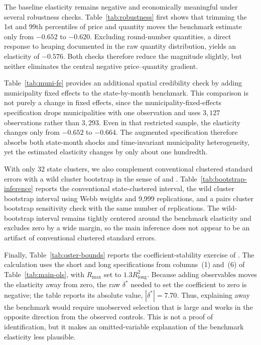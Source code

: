 The baseline elasticity remains negative and economically meaningful under several robustness checks.  Table~\ref{tab:robustness} first shows that trimming the 1st and 99th percentiles of price and quantity moves the benchmark estimate only from $-0.652$ to $-0.620$.  Excluding round-number quantities, a direct response to heaping documented in the raw quantity distribution, yields an elasticity of $-0.576$.  Both checks therefore reduce the magnitude slightly, but neither eliminates the central negative price--quantity gradient.



Table~\ref{tab:muni-fe} provides an additional spatial credibility check by adding municipality fixed effects to the state-by-month benchmark.  This comparison is not purely a change in fixed effects, since the municipality-fixed-effects specification drops municipalities with one observation and uses $3{,}127$ observations rather than $3{,}293$.  Even in that restricted sample, the elasticity changes only from $-0.652$ to $-0.664$.  The augmented specification therefore absorbs both state-month shocks and time-invariant municipality heterogeneity, yet the estimated elasticity changes by only about one hundredth.



With only 32 state clusters, we also complement conventional clustered standard errors with a wild cluster bootstrap in the sense of \citet{cameron2008bootstrap} and \citet{roodman2019fast}.  Table~\ref{tab:bootstrap-inference} reports the conventional state-clustered interval, the wild cluster bootstrap interval using Webb weights and 9{,}999 replications, and a pairs cluster bootstrap sensitivity check with the same number of replications.  The wild-bootstrap interval remains tightly centered around the benchmark elasticity and excludes zero by a wide margin, so the main inference does not appear to be an artifact of conventional clustered standard errors.



Finally, Table~\ref{tab:oster-bounds} reports the coefficient-stability exercise of \citet{oster2019unobservable}.  The calculation uses the short and long specifications from columns~(1) and~(6) of Table~\ref{tab:main-ols}, with $R_{\max}$ set to $1.3R^2_{\text{long}}$.  Because adding observables moves the elasticity away from zero, the raw $\delta^{*}$ needed to set the coefficient to zero is negative; the table reports its absolute value, $|\delta^{*}|=7.70$.  Thus, explaining away the benchmark would require unobserved selection that is large and works in the opposite direction from the observed controls.  This is not a proof of identification, but it makes an omitted-variable explanation of the benchmark elasticity less plausible.


